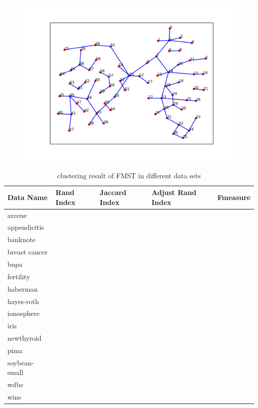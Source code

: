\documentclass[preprint,12pt]{elsarticle}
\begin{document}
\begin{figure}[!t]
{\begin{minipage}[b]{0.6\linewidth}
		\includegraphics[width=1\linewidth]{step3.png}
		\end{minipage}}
	    \end{figure}
\begin{table}[htb]
	      \centering
	      \caption{clustering result of FMST in different data sets}
	      \label{my-label}
	      \begin{tabular}{|lllll|}
	        \hline
	         Data Name & Rand Index  & Jaccard Index  & Adjust Rand Index & F\-measure  \\ \hline
	         arcene         &  & &  &  \\ 
	         appendicitis   &  & &  &  \\ 
	         banknote       &  & &  &  \\ 
	         breast cancer  &  & &  & \\ 
	         bupa           &  & &  &  \\ 
	         fertility      &  & &  & \\ 
	         haberman       &  & &  &  \\ 
	         hayes-roth     &  & &  & \\ 
	         ionosphere     &  & &  &  \\ 
	         iris           &  & &  & \\ 
	         newthyroid     &  & &  &  \\ 
	         pima           &  & &  & \\ 
	         soybean-small  &  & &  & \\ 
	         wdbc           &  & &  & \\ 
	         wine           &  & &  &  \\ 
	         \hline
	      \end{tabular}
	    \end{table} 
\end{document}
